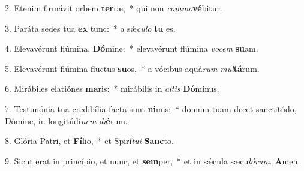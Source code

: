 
2. Etenim firmávit orbem \textbf{ter}ræ,~* qui non \textit{com}\textit{mo}\textbf{vé}bitur.

3. Paráta sedes tua \textbf{ex} tunc:~* a s\'{\ae}\textit{cu}\textit{lo} \textbf{tu} es.

4. Elevavérunt flúmina, \textbf{Dó}mine:~* elevavérunt flúmina \textit{vo}\textit{cem} \textbf{su}am.

5. Elevavérunt flúmina fluctus \textbf{su}os,~* a vócibus aquá\textit{rum} \textit{mul}\textbf{tá}rum.

6. Mirábiles elatiónes \textbf{ma}ris:~* mirábilis in \textit{al}\textit{tis} \textbf{Dó}minus.

7. Testimónia tua credibília facta sunt \textbf{ni}mis:~* domum tuam decet sanctitúdo, Dómine, in longitúdi\textit{nem} \textit{di}\textbf{é}rum.

8. Glória Patri, et \textbf{Fí}lio,~* et Spirí\textit{tu}\textit{i} \textbf{Sanc}to.

9. Sicut erat in princípio, et nunc, et \textbf{sem}per,~* et in s\'{\ae}cula sæcu\textit{ló}\textit{rum}. \textbf{A}men.